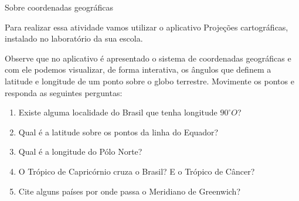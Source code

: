\begin{task}{Sobre coordenadas geográficas} 

Para realizar essa atividade vamos utilizar o aplicativo Projeções cartográficas, instalado no laboratório da sua escola.

Observe que no aplicativo é apresentado o sistema de coordenadas geográficas e com ele podemos  visualizar, de forma interativa, os ângulos que definem a latitude e longitude de um ponto sobre o globo terrestre. Movimente os pontos e responda as seguintes perguntas:
\begin{enumerate}
\item Existe alguma localidade do Brasil que tenha longitude $90^{\circ} O$? 
\item Qual é a latitude sobre os pontos da linha do Equador? 
\item Qual é a longitude do Pólo Norte? 
\item O Trópico de Capricórnio cruza o Brasil? E o Trópico de Câncer? 
\item Cite alguns países por onde passa o Meridiano de Greenwich?
\end{enumerate}
\end{task}

